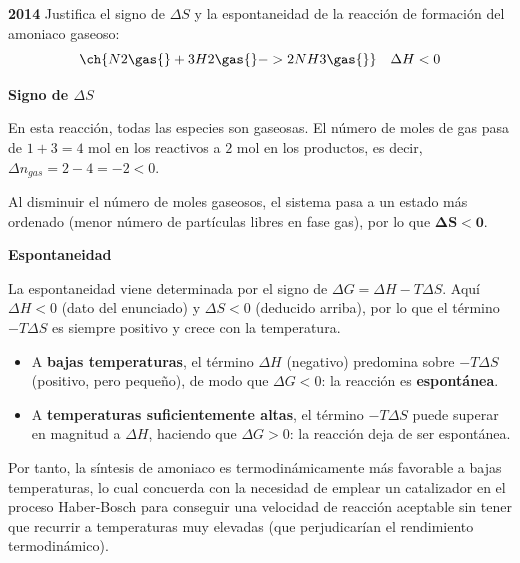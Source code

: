 \begin{exerciseEVAU}
    \textbf{2014} Justifica el signo de \(\Delta S\) y la espontaneidad de la reacción de formación del amoniaco gaseoso:
    \begin{equation*}
        \ch{N2 \gas{} + 3 H2 \gas{} -> 2 NH3 \gas{}} \quad \Delta H <0
    \end{equation*}

    \begin{solu}

        \textbf{Signo de \(\Delta S\)}

        En esta reacción, todas las especies son gaseosas. El número de moles de gas pasa de \(1 + 3 = 4\) mol en los reactivos a \(2\) mol en los productos, es decir, \(\Delta n_{gas} = 2 - 4 = -2 < 0\).

        Al disminuir el número de moles gaseosos, el sistema pasa a un estado más ordenado (menor número de partículas libres en fase gas), por lo que \(\boldsymbol{\Delta S < 0}\).

        \textbf{Espontaneidad}

        La espontaneidad viene determinada por el signo de \(\Delta G = \Delta H - T \Delta S\). Aquí \(\Delta H < 0\) (dato del enunciado) y \(\Delta S < 0\) (deducido arriba), por lo que el término \(-T\Delta S\) es siempre positivo y crece con la temperatura.

        \begin{itemize}
            \item A \textbf{bajas temperaturas}, el término \(\Delta H\) (negativo) predomina sobre \(-T\Delta S\) (positivo, pero pequeño), de modo que \(\Delta G < 0\): la reacción es \textbf{espontánea}.
            \item A \textbf{temperaturas suficientemente altas}, el término \(-T\Delta S\) puede superar en magnitud a \(\Delta H\), haciendo que \(\Delta G > 0\): la reacción deja de ser espontánea.
        \end{itemize}

        Por tanto, la síntesis de amoniaco es termodinámicamente más favorable a bajas temperaturas, lo cual concuerda con la necesidad de emplear un catalizador en el proceso Haber-Bosch para conseguir una velocidad de reacción aceptable sin tener que recurrir a temperaturas muy elevadas (que perjudicarían el rendimiento termodinámico).

    \end{solu}
\end{exerciseEVAU}

